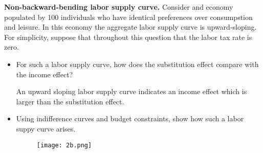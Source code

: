\documentclass[11pt]{SelfArxOneColBMN}
\begin{document}
\begin{exercise}
	\textbf{Non-backward-bending labor supply curve.} Consider and economy populated by 100 individuals who have identical preferences over consumpstion and leisure. In this economy the aggregate labor supply curve is upward-sloping. For simplicity, suppose that throughout this question that the labor tax rate is zero.
\begin{itemize}
	\item For such a labor supply curve, how does the substitution effect compare with the income effect?
		\begin{solution}
			An upward sloping labor supply curve indicates an income effect which is larger than the substitution effect.
		\end{solution}
	\item Using indifference curves and budget constraints, show how such a labor suppy curve arises. 
        \begin{figure}
		\texttt{[image: 2b.png]}
        \end{figure}
\end{itemize}
\end{exercise}
\end{document}

